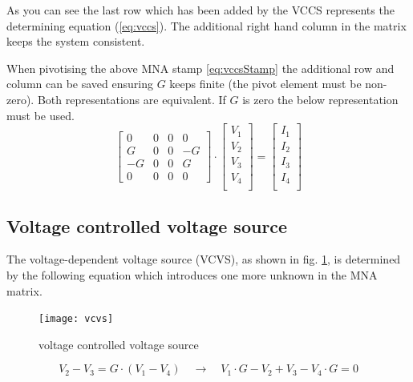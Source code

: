 As you can see the last row which has been added by the VCCS
represents the determining equation (\ref{eq:vccs}).  The additional
right hand column in the matrix keeps the system consistent.

\addvspace{12pt}

When pivotising the above MNA stamp \eqref{eq:vccsStamp} the
additional row and column can be saved ensuring $G$ keeps finite (the
pivot element must be non-zero).  Both representations are equivalent.
If $G$ is zero the below representation must be used.
\begin{equation}
\begin{bmatrix}
0&0&0&0\\
G&0&0&-G\\
-G&0&0&G\\
0&0&0&0
\end{bmatrix}
\cdot
\begin{bmatrix}
V_{1}\\
V_{2}\\
V_{3}\\
V_{4}\\
\end{bmatrix}
=
\begin{bmatrix}
I_{1}\\
I_{2}\\
I_{3}\\
I_{4}\\
\end{bmatrix}
\end{equation}

\subsection{Voltage controlled voltage source}
\label{sec:vcvs}

The voltage-dependent voltage source (VCVS), as shown in fig.
\ref{fig:vcvs}, is determined by the following equation which
introduces one more unknown in the MNA matrix.

\begin{figure}[ht]
\begin{center}
\texttt{[image: vcvs]}
\end{center}
\caption{voltage controlled voltage source}
\label{fig:vcvs}
\end{figure}
\FloatBarrier

\begin{equation}
V_{2} - V_{3} = G\cdot \left(V_{1} - V_{4}\right)
\quad \rightarrow \quad
V_{1}\cdot G - V_{2} + V_{3} - V_{4}\cdot G = 0
\label{eq:vcvs}
\end{equation}


